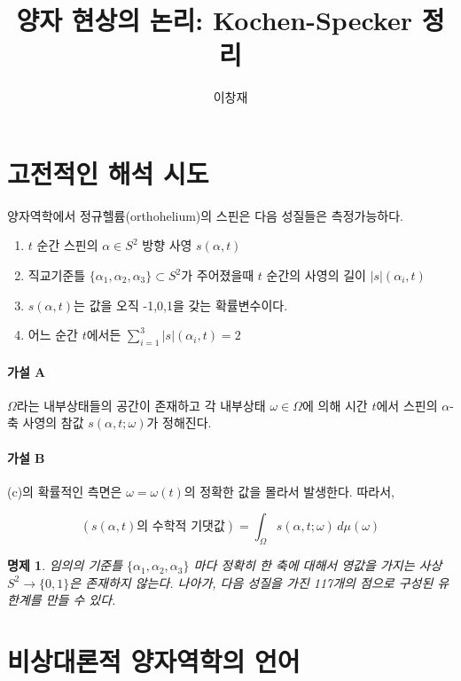 \documentclass[a4paper,12pt]{article}
\title{양자 현상의 논리: Kochen-Specker 정리}
\author{이창재}
\theoremstyle{definition}
\theoremstyle{plain}
\newtheorem{proposition}{명제}
\theoremstyle{remark}
\begin{document}
\maketitle

\section{고전적인 해석 시도}

양자역학에서 정규헬륨(orthohelium)의 스핀은 다음 성질들은 측정가능하다.

\begin{enumerate}[label=(\alph*)]
    \item \(t\) 순간 스핀의 \(\alpha \in S^2\) 방향 사영 \(s(\alpha,t)\)
    \item 직교기준틀 \(\{\alpha_1,\alpha_2,\alpha_3\} \subset S^2\)가 주어졌을때 \(t\) 순간의 사영의 길이 \(|s|(\alpha_i,t)\)
    \item \(s(\alpha,t)\)는 값을 오직 -1,0,1을 갖는 확률변수이다.
    \item 어느 순간 \(t\)에서든 \(\sum_{i=1}^{3} |s|(\alpha_i,t)=2\)
\end{enumerate}

\paragraph*{가설 A} \(\Omega\)라는 내부상태들의 공간이 존재하고 각 내부상태 \(\omega \in \Omega\)에 의해 시간 \(t\)에서 스핀의 \(\alpha\)-축 사영의 참값 \(s(\alpha,t;\omega)\)가 정해진다.

\paragraph*{가설 B} (c)의 확률적인 측면은 \(\omega=\omega(t)\)의 정확한 값을 몰라서 발생한다. 따라서,

\[(s(\alpha,t)\mbox{의 수학적 기댓값}) = \int_{\Omega} s(\alpha,t;\omega)\, d\mu(\omega)\]

\begin{proposition}
    임의의 기준틀 \(\{\alpha_1,\alpha_2,\alpha_3\}\) 마다 정확히 한 축에 대해서 영값을 가지는 사상 \(S^2 \to \{0,1\}\)은 존재하지 않는다. 나아가, 다음 성질을 가진 117개의 점으로 구성된 유한계를 만들 수 있다. 
\end{proposition}

\section{비상대론적 양자역학의 언어}
\end{document}
